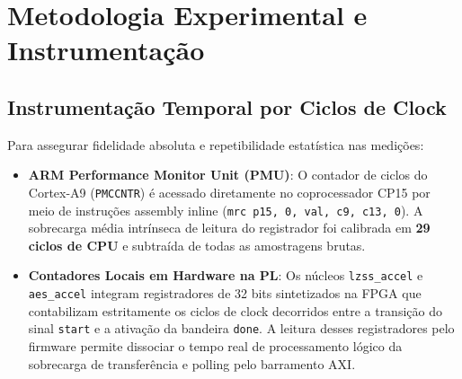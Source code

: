 \documentclass[11pt,a4paper]{article}
\begin{document}
\section{Metodologia Experimental e Instrumentação}

\subsection{Instrumentação Temporal por Ciclos de Clock}
Para assegurar fidelidade absoluta e repetibilidade estatística nas medições:
\begin{itemize}
  \item \textbf{ARM Performance Monitor Unit (PMU)}: O contador de ciclos do Cortex-A9 (\texttt{PMCCNTR}) é acessado diretamente no coprocessador CP15 por meio de instruções assembly inline (\texttt{mrc p15, 0, val, c9, c13, 0}). A sobrecarga média intrínseca de leitura do registrador foi calibrada em \textbf{29 ciclos de CPU} e subtraída de todas as amostragens brutas.
  \item \textbf{Contadores Locais em Hardware na PL}: Os núcleos \texttt{lzss\_accel} e \texttt{aes\_accel} integram registradores de 32 bits sintetizados na FPGA que contabilizam estritamente os ciclos de clock decorridos entre a transição do sinal \texttt{start} e a ativação da bandeira \texttt{done}. A leitura desses registradores pelo firmware permite dissociar o tempo real de processamento lógico da sobrecarga de transferência e polling pelo barramento AXI.
\end{itemize}
\end{document}
